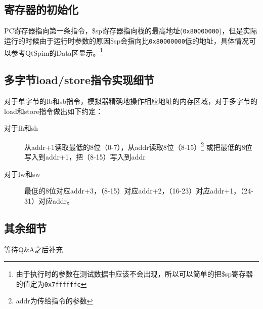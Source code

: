 \documentclass[a4paper, 11pt]{article}
\begin{document}
\subsection{寄存器的初始化}
	PC寄存器指向第一条指令，\$sp寄存器指向栈的最高地址(\texttt{0x80000000})，但是实际运行的时候由于运行时参数的原因\$sp会指向比\texttt{0x80000000}低的地址，具体情况可以参考QtSpim的Data区显示。\footnote{由于执行时的参数在测试数据中应该不会出现，所以可以简单的把\$sp寄存器的值定为\texttt{0x7ffffffc}}
\subsection{多字节load/store指令实现细节}
	对于单字节的lb和sb指令，模拟器精确地操作相应地址的内存区域，对于多字节的load和store指令做出如下约定：
	\begin{description}
		\item [对于lh和sh] 从addr+1读取最低的8位（0-7），从addr读取8位（8-15）\footnote{addr为传给指令的参数} 或把最低的8位写入到addr+1，把（8-15）写入到addr
		\item [对于lw和sw] 最低的8位对应addr+3，（8-15）对应addr+2，（16-23）对应addr+1，（24-31）对应addr。
	\end{description}
\subsection{其余细节}
	等待Q\&A之后补充
\end{document}
